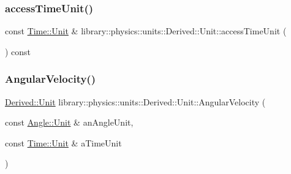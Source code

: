 \subsubsection{\texorpdfstring{access\+Time\+Unit()}{accessTimeUnit()}}
{\footnotesize\ttfamily const \hyperlink{classlibrary_1_1physics_1_1units_1_1_time_ab876a6a05c9a2f28905f2753bfd64109}{Time\+::\+Unit} \& library\+::physics\+::units\+::\+Derived\+::\+Unit\+::access\+Time\+Unit (\begin{DoxyParamCaption}{ }\end{DoxyParamCaption}) const}

\mbox{\label{classlibrary_1_1physics_1_1units_1_1_derived_1_1_unit_addd355a633d2d5addd72efdd7cfebc65}} 
\subsubsection{\texorpdfstring{Angular\+Velocity()}{AngularVelocity()}}
{\footnotesize\ttfamily \hyperlink{classlibrary_1_1physics_1_1units_1_1_derived_1_1_unit}{Derived\+::\+Unit} library\+::physics\+::units\+::\+Derived\+::\+Unit\+::\+Angular\+Velocity (\begin{DoxyParamCaption}\item[{const \hyperlink{classlibrary_1_1physics_1_1units_1_1_angle_a3c329d415a61783b16ce481874cc5956}{Angle\+::\+Unit} \&}]{an\+Angle\+Unit,  }\item[{const \hyperlink{classlibrary_1_1physics_1_1units_1_1_time_ab876a6a05c9a2f28905f2753bfd64109}{Time\+::\+Unit} \&}]{a\+Time\+Unit }\end{DoxyParamCaption})\hspace{0.3cm}{\ttfamily [static]}}

\mbox{\label{classlibrary_1_1physics_1_1units_1_1_derived_1_1_unit_ad8e71820dabe4073b90ae3681f31b420}} 
